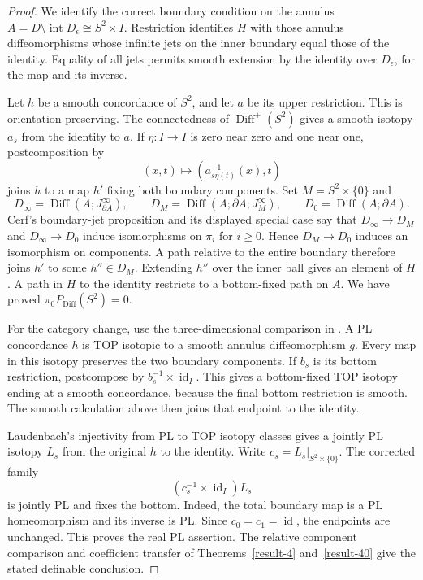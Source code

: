\begin{proof}
We identify the correct boundary condition on the annulus
$A=D\setminus\operatorname{int}D_\epsilon\cong S^2\times I$.
Restriction identifies $H$ with those annulus diffeomorphisms whose
infinite jets on the inner boundary equal those of the identity.
Equality of all jets permits smooth extension by the identity over
$D_\epsilon$, for the map and its inverse.

Let $h$ be a smooth concordance of $S^2$, and let $a$ be its upper
restriction.  This is orientation preserving.  The connectedness
of $\operatorname{Diff}^{+}(S^2)$
\cite[Theorem~4 and Corollary~2, p.~8-13]{Cerf1962Fibration}
gives a smooth isotopy $a_s$ from the identity to $a$.  If
$\eta:I\to I$ is zero near zero and one near one, postcomposition by
\[
                  (x,t)\longmapsto(a_{s\eta(t)}^{-1}(x),t)
\]
joins $h$ to a map $h'$ fixing both boundary components.
Set $M=S^2\times\{0\}$ and
\[
 D_\infty=\operatorname{Diff}(A;J^\infty_{\partial A}),\qquad
 D_M=\operatorname{Diff}(A;\partial A;J^\infty_M),\qquad
 D_0=\operatorname{Diff}(A;\partial A).
\]
Cerf's boundary-jet proposition and its displayed special case
\cite[Proposition~1, p.~8-06]{Cerf1962Fibration}
say that $D_\infty\to D_M$ and $D_\infty\to D_0$ induce
isomorphisms on $\pi_i$ for $i\ge0$.  Hence $D_M\to D_0$ induces
an isomorphism on components.  A path relative to the entire
boundary therefore joins $h'$ to some $h''\in D_M$.
Extending $h''$ over the inner ball gives an element of $H$.
A path in $H$ to the identity restricts to a bottom-fixed path on
$A$.  We have proved
$\pi_0P_{\mathrm{Diff}}(S^2)=0$.

For the category change, use the three-dimensional comparison in
\cite[Chapter~I, Section~1, pp.~7--9]{Laudenbach1974}.
A PL concordance $h$ is TOP isotopic to a smooth annulus
diffeomorphism $g$.  Every map in this isotopy preserves the two
boundary components.  If $b_s$ is its bottom restriction,
postcompose by $b_s^{-1}\times\operatorname{id}_I$.  This gives a
bottom-fixed TOP isotopy ending at a smooth concordance, because
the final bottom restriction is smooth.  The smooth calculation
above then joins that endpoint to the identity.

Laudenbach's injectivity from PL to TOP isotopy classes gives a
jointly PL isotopy $L_s$ from the original $h$ to the identity.
Write $c_s=L_s|_{S^2\times\{0\}}$.  The corrected family
\[
                    (c_s^{-1}\times\operatorname{id}_I)L_s
\]
is jointly PL and fixes the bottom.  Indeed, the total boundary
map is a PL homeomorphism and its inverse is PL.  Since
$c_0=c_1=\operatorname{id}$, the endpoints are unchanged.
This proves the real PL assertion.  The relative component
comparison and coefficient transfer of
Theorems~\ref{result-4} and~\ref{result-40} give the stated
definable conclusion.
\end{proof}


